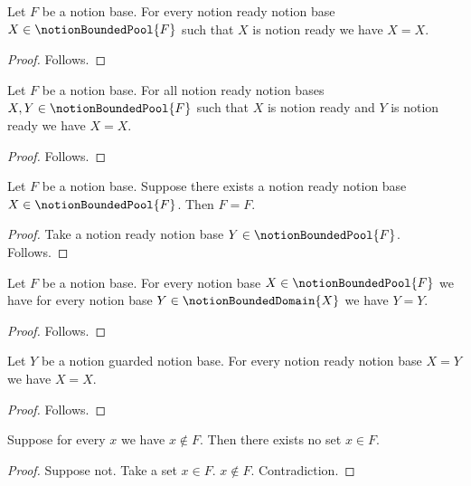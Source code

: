 

\begin{proposition}\label{notion_bounded_modifier}
    Let $F$ be a notion base.
    For every notion ready notion base $X\in\notionBoundedPool{F}$
        such that $X$ is notion ready we have $X=X$.
\end{proposition}
\begin{proof}
    Follows.
\end{proof}

\begin{proposition}\label{notion_bounded_group}
    Let $F$ be a notion base.
    For all notion ready notion bases $X,Y\in\notionBoundedPool{F}$
        such that $X$ is notion ready and $Y$ is notion ready we have $X=X$.
\end{proposition}
\begin{proof}
    Follows.
\end{proof}

\begin{proposition}\label{notion_bounded_choice}
    Let $F$ be a notion base.
    Suppose there exists a notion ready notion base $X\in\notionBoundedPool{F}$.
    Then $F=F$.
\end{proposition}
\begin{proof}
    Take a notion ready notion base $Y\in\notionBoundedPool{F}$.
    Follows.
\end{proof}

\begin{proposition}\label{notion_bounded_nested}
    Let $F$ be a notion base.
    For every notion base $X\in\notionBoundedPool{F}$ we have
        for every notion base $Y\in\notionBoundedDomain{X}$ we have $Y=Y$.
\end{proposition}
\begin{proof}
    Follows.
\end{proof}

\begin{proposition}\label{notion_bounded_equality_transport}
    Let $Y$ be a notion guarded notion base.
    For every notion ready notion base $X=Y$ we have $X=X$.
\end{proposition}
\begin{proof}
    Follows.
\end{proof}

\begin{proposition}\label{notion_bounded_empty_domain}
    Suppose for every $x$ we have $x\notin F$.
    Then there exists no set $x\in F$.
\end{proposition}
\begin{proof}
    Suppose not.
    Take a set $x\in F$.
    $x\notin F$.
    Contradiction.
\end{proof}
